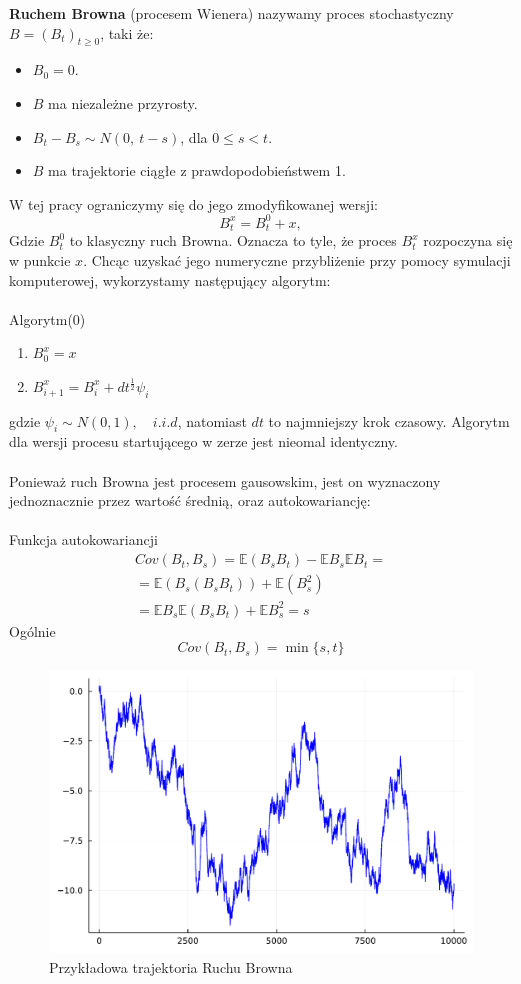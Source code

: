 \documentclass{article}
\theoremstyle{break}
\numberwithin{equation}{subsection}
\numberwithin{figure}{section}
\begin{document}
\textbf{Ruchem Browna} (procesem Wienera) nazywamy proces stochastyczny $B = (B_t)_{t\geq0}$, taki że:
\begin{itemize}
	\item $B_0=0$.
	\item $B$ ma niezależne przyrosty.
	\item $B_t-B_s\sim N(0,~t-s)$, dla $0\leq s<t$.
	\item $B$ ma trajektorie ciągłe z prawdopodobieństwem 1.
\end{itemize}
W tej pracy ograniczymy się do jego zmodyfikowanej wersji:
$$B_t^x=B_t^0+x,$$
Gdzie $B_t^0$ to klasyczny ruch Browna. Oznacza to tyle, że proces $B_t^x$ rozpoczyna się w punkcie $x$. Chcąc uzyskać jego numeryczne przybliżenie przy pomocy symulacji komputerowej, wykorzystamy następujący algorytm:
\\ \\
Algorytm(0)
\begin{enumerate}
	\item $B_0^x=x$
	\item $B_{i+1}^x=B_{i}^x+dt^{\frac{1}{2}}\psi_i$
\end{enumerate}
gdzie $\psi_i\sim N(0,1),\quad i.i.d$, natomiast $dt$ to najmniejszy krok czasowy. Algorytm dla wersji procesu startującego w zerze jest nieomal identyczny.\\ \\ 

Ponieważ ruch Browna jest procesem gausowskim, jest on wyznaczony jednoznacznie przez wartość średnią, oraz autokowariancję:\\\\
Funkcja autokowariancji
\begin{gather}
	Cov(B_t,B_s)=\mathbb{E}(B_sB_t)-\mathbb{E}B_s\mathbb{E}B_t=\\
	=\mathbb{E}(B_s(B_sB_t))+\mathbb{E}(B_s^2)\\
	=\mathbb{E}B_s\mathbb{E}(B_sB_t)+\mathbb{E}B_s^2=s
\end{gather}
Ogólnie
$$Cov(B_t,B_s)=\min\{s,t\}$$

\begin{figure}[H]
	\center
	\includegraphics[scale=0.35]{przyklad_trajektorii.pdf}
	\caption{Przykładowa trajektoria Ruchu Browna}
	\label{fig: pojedyncza_browna}
\end{figure}
\end{document}
